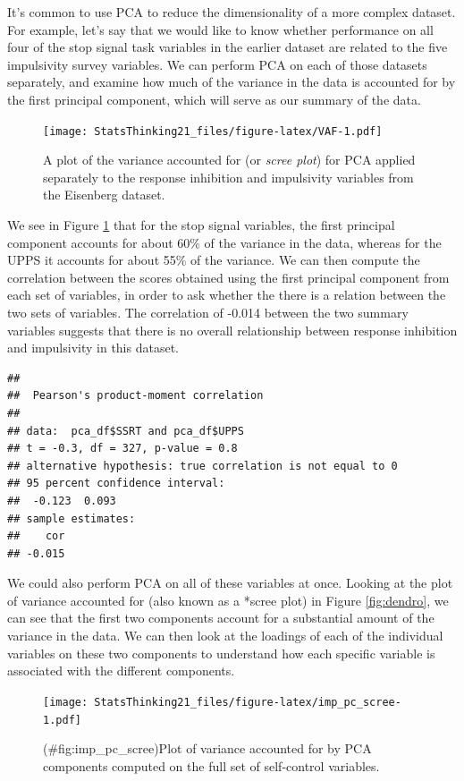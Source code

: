 \documentclass[
  12pt,
]{book}
\begin{document}
It's common to use PCA to reduce the dimensionality of a more complex dataset. For example, let's say that we would like to know whether performance on all four of the stop signal task variables in the earlier dataset are related to the five impulsivity survey variables. We can perform PCA on each of those datasets separately, and examine how much of the variance in the data is accounted for by the first principal component, which will serve as our summary of the data.

\begin{figure}
\centering
\texttt{[image: StatsThinking21\_files/figure-latex/VAF-1.pdf]}
\caption{\label{fig:VAF}A plot of the variance accounted for (or \emph{scree plot}) for PCA applied separately to the response inhibition and impulsivity variables from the Eisenberg dataset.}
\end{figure}

We see in Figure \ref{fig:VAF} that for the stop signal variables, the first principal component accounts for about 60\% of the variance in the data, whereas for the UPPS it accounts for about 55\% of the variance. We can then compute the correlation between the scores obtained using the first principal component from each set of variables, in order to ask whether the there is a relation between the two sets of variables. The correlation of -0.014 between the two summary variables suggests that there is no overall relationship between response inhibition and impulsivity in this dataset.

\begin{verbatim}
## 
##  Pearson's product-moment correlation
## 
## data:  pca_df$SSRT and pca_df$UPPS
## t = -0.3, df = 327, p-value = 0.8
## alternative hypothesis: true correlation is not equal to 0
## 95 percent confidence interval:
##  -0.123  0.093
## sample estimates:
##    cor 
## -0.015
\end{verbatim}

We could also perform PCA on all of these variables at once. Looking at the plot of variance accounted for (also known as a *scree plot) in Figure \ref{fig:dendro}, we can see that the first two components account for a substantial amount of the variance in the data. We can then look at the loadings of each of the individual variables on these two components to understand how each specific variable is associated with the different components.

\begin{figure}
\centering
\texttt{[image: StatsThinking21\_files/figure-latex/imp\_pc\_scree-1.pdf]}
\caption{(\#fig:imp\_pc\_scree)Plot of variance accounted for by PCA components computed on the full set of self-control variables.}
\end{figure}
\end{document}
